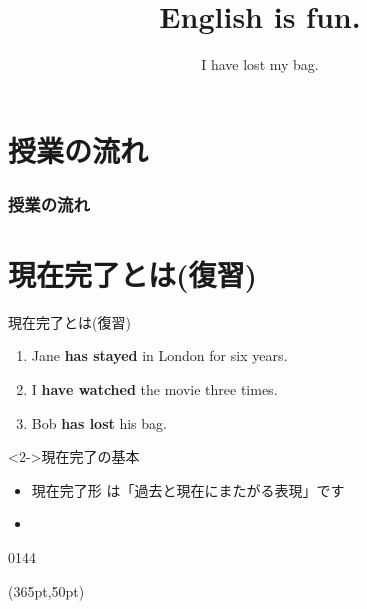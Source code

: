 \documentclass[aspectratio=169,xcolor={dvipsnames,table}]{beamer}
\title{English is fun.}
\subtitle{I have lost my bag.}
\author{}
\institute[]{}
\date[]
\newcommand{\myaudio}[1]{\href{#1}{\faVolumeUp}}
\begin{document}
\begin{frame}[plain]
  \titlepage
\end{frame}

\section*{授業の流れ}
\begin{frame}[plain]
  \frametitle{授業の流れ}
  \tableofcontents
\end{frame}
\section{現在完了とは(復習)}
\begin{frame}[plain]{現在完了とは(復習)}
 \begin{enumerate}
 \item Jane \textcolor{NavyBlue}{\bfseries has stayed} in London for six years.
 \item I \textcolor{NavyBlue}{\bfseries have watched} the movie three times.
 \item Bob \textcolor{NavyBlue}{\bfseries has lost} his bag.
\end{enumerate}

\vspace{30pt}

 \begin{block}<2->{現在完了の基本}
\small
\begin{itemize}[square]
 \item<3->  現在完了形\,\,は「過去と現在にまたがる表現」です\\
\hfill{}
 \item {}%
\end{itemize}
      \end{block}
\hfill{\tiny 0144}\,{\scriptsize \myaudio{./audio/014_have_pp_kekka_01.mp3}}

\begin{textblock*}{0.4\linewidth}(365pt,50pt)
\end{textblock*}
\end{frame}
\end{document}
